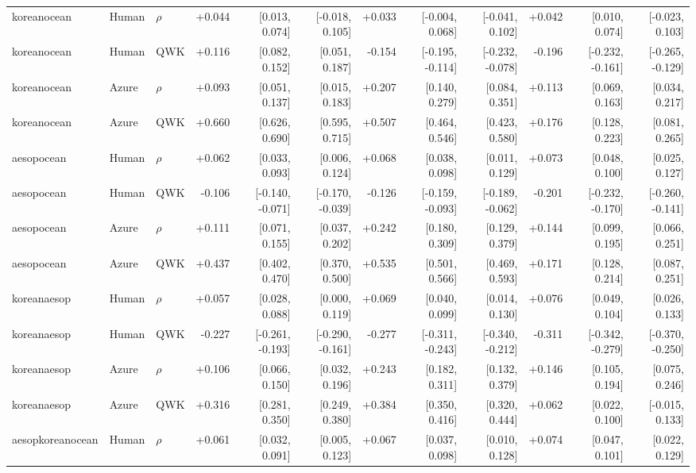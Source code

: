 \begin{landscape}
\begin{longtable}{@{}lllrrrrrrrrr@{}}
\addlinespace[2pt]
koreanocean & Human & $\rho$ & +0.044 & [0.013, 0.074] & [-0.018, 0.105] & +0.033 & [-0.004, 0.068] & [-0.041, 0.102] & +0.042 & [0.010, 0.074] & [-0.023, 0.103]\\
koreanocean & Human & QWK & +0.116 & [0.082, 0.152] & [0.051, 0.187] & -0.154 & [-0.195, -0.114] & [-0.232, -0.078] & -0.196 & [-0.232, -0.161] & [-0.265, -0.129]\\
koreanocean & Azure & $\rho$ & +0.093 & [0.051, 0.137] & [0.015, 0.183] & +0.207 & [0.140, 0.279] & [0.084, 0.351] & +0.113 & [0.069, 0.163] & [0.034, 0.217]\\
koreanocean & Azure & QWK & +0.660 & [0.626, 0.690] & [0.595, 0.715] & +0.507 & [0.464, 0.546] & [0.423, 0.580] & +0.176 & [0.128, 0.223] & [0.081, 0.265]\\
\addlinespace[2pt]
aesopocean & Human & $\rho$ & +0.062 & [0.033, 0.093] & [0.006, 0.124] & +0.068 & [0.038, 0.098] & [0.011, 0.129] & +0.073 & [0.048, 0.100] & [0.025, 0.127]\\
aesopocean & Human & QWK & -0.106 & [-0.140, -0.071] & [-0.170, -0.039] & -0.126 & [-0.159, -0.093] & [-0.189, -0.062] & -0.201 & [-0.232, -0.170] & [-0.260, -0.141]\\
aesopocean & Azure & $\rho$ & +0.111 & [0.071, 0.155] & [0.037, 0.202] & +0.242 & [0.180, 0.309] & [0.129, 0.379] & +0.144 & [0.099, 0.195] & [0.066, 0.251]\\
aesopocean & Azure & QWK & +0.437 & [0.402, 0.470] & [0.370, 0.500] & +0.535 & [0.501, 0.566] & [0.469, 0.593] & +0.171 & [0.128, 0.214] & [0.087, 0.251]\\
\addlinespace[2pt]
koreanaesop & Human & $\rho$ & +0.057 & [0.028, 0.088] & [0.000, 0.119] & +0.069 & [0.040, 0.099] & [0.014, 0.130] & +0.076 & [0.049, 0.104] & [0.026, 0.133]\\
koreanaesop & Human & QWK & -0.227 & [-0.261, -0.193] & [-0.290, -0.161] & -0.277 & [-0.311, -0.243] & [-0.340, -0.212] & -0.311 & [-0.342, -0.279] & [-0.370, -0.250]\\
koreanaesop & Azure & $\rho$ & +0.106 & [0.066, 0.150] & [0.032, 0.196] & +0.243 & [0.182, 0.311] & [0.132, 0.379] & +0.146 & [0.105, 0.194] & [0.075, 0.246]\\
koreanaesop & Azure & QWK & +0.316 & [0.281, 0.350] & [0.249, 0.380] & +0.384 & [0.350, 0.416] & [0.320, 0.444] & +0.062 & [0.022, 0.100] & [-0.015, 0.133]\\
\addlinespace[2pt]
aesopkoreanocean & Human & $\rho$ & +0.061 & [0.032, 0.091] & [0.005, 0.123] & +0.067 & [0.037, 0.098] & [0.010, 0.128] & +0.074 & [0.047, 0.101] & [0.022, 0.129]\\

\end{longtable}
\end{landscape}
